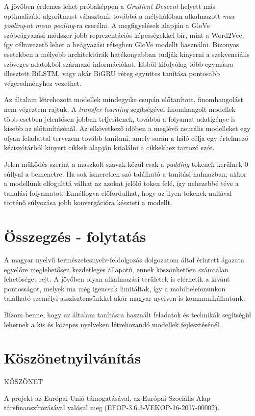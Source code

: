 A jövőben érdemes lehet próbaképpen a \textit{Gradient Descent} helyett más optimalizáló algoritmust választani, továbbá a mélyhálóban alkalmazott \textit{max pooling}-ot \textit{mean pooling}-ra cserélni. A megfigyelések alapján a GloVe szóbeágyazási módszer jobb reprezentációs képességekkel bír, mint a Word2Vec, így célravezető lehet a beágyazási rétegben GloVe modellt használni. Bizonyos esetekben a mélyebb architektúrák hatékonyabban tudják kinyerni a szekvenciális szöveges adatokból származó információkat. Ebből kifolyólag több egymásra illesztett BiLSTM, vagy akár BiGRU réteg együttes tanítása pontosabb végeredményhez vezethet.

Az általam létrehozott modellek mindegyike csupán előtanított, finomhangolást nem végeztem rajtuk. A \textit{transfer learning} segítségével finomhangolt modellek több esetben jelentősen jobban teljesítenek, továbbá a folyamat adatigénye is kisebb az előtanításénál. Az elkövetkező időben a meglévő neurális modelleket egy olyan feladattal tervezem tovább tanítani, amely során a háló célja egy értelmező kéziszótárból kinyert cikkek alapján kitalálni a cikkekhez tartozó szót.

Jelen működés szerint a maszkolt szavak közül csak a \textit{padding} tokenek kerülnek 0 súllyal a bemenetre. Ha sok ismeretlen szó található a tanítási halmazban, akkor a modellünk elfogulttá válhat az azokat jelölő token felé, így nehezebbé téve a tanulási folyamatot. Ennélfogva előfordulhat, hogy az ilyen tokenek nullával történő súlyozása jobb konvergációra készteti a modellt.

\section*{Összegzés - folytatás}

A magyar nyelvű természetesnyelv-feldolgozás dolgozatom által érintett ágazata egyelőre meglehetősen kezdetleges állapotú, ennek köszönhetően számtalan lehetőséget rejt. A jövőben olyan alkalmazási területek is elérhetik a kívánt pontosságot, melyek ma még igencsak limitáltak, így a mobiltelefonunkon található személyi asszisztensünkkel akár magyar nyelven is kommunikálhatunk.

Bízom benne, hogy az általam tanításra használt feladatok és technikák segítségül lehetnek a kis és közepes nyelveken létrehozandó modellek fejlesztésénél.



\section{Köszönetnyilvánítás}

KÖSZÖNET

A projekt az Európai Unió támogatásával, az Európai Szociális Alap
társfinanszírozásával valósul meg (EFOP-3.6.3-VEKOP-16-2017-00002).

